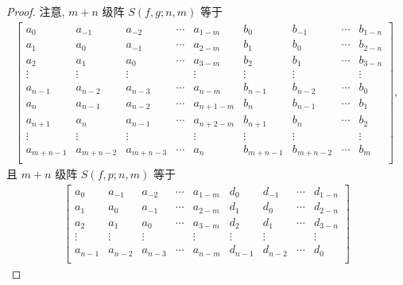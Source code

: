 \documentclass[../libro.tex]{subfiles}
\begin{document}
\begin{proof}
    注意, \(m + n\) 级阵 \(S(f, g; n, m)\) 等于
    \begin{align*}
        \begin{bmatrix}
            a_{0}     & a_{-1}    & a_{-2}    & \cdots & a_{1-m}   & b_{0}     & b_{-1}    & \cdots & b_{1-n} \\
            a_{1}     & a_{0}     & a_{-1}    & \cdots & a_{2-m}   & b_{1}     & b_{0}     & \cdots & b_{2-n} \\
            a_{2}     & a_{1}     & a_{0}     & \cdots & a_{3-m}   & b_{2}     & b_{1}     & \cdots & b_{3-n} \\
            \vdots    & \vdots    & \vdots    & {}     & \vdots    & \vdots    & \vdots    & {}     & \vdots  \\
            a_{n-1}   & a_{n-2}   & a_{n-3}   & \cdots & a_{n-m}   & b_{n-1}   & b_{n-2}   & \cdots & b_{0}   \\
            a_{n}     & a_{n-1}   & a_{n-2}   & \cdots & a_{n+1-m} & b_{n}     & b_{n-1}   & \cdots & b_{1}   \\
            a_{n+1}   & a_{n}     & a_{n-1}   & \cdots & a_{n+2-m} & b_{n+1}   & b_{n}     & \cdots & b_{2}   \\
            \vdots    & \vdots    & \vdots    & {}     & \vdots    & \vdots    & \vdots    & {}     & \vdots  \\
            a_{m+n-1} & a_{m+n-2} & a_{m+n-3} & \cdots & a_{n}     & b_{m+n-1} & b_{m+n-2} & \cdots & b_{m}   \\
        \end{bmatrix},
    \end{align*}
    且 \(m + n\) 级阵 \(S(f, p; n, m)\) 等于
    \begin{align*}
        \begin{bmatrix}
            a_{0}     & a_{-1}    & a_{-2}    & \cdots & a_{1-m}   & d_{0}     & d_{-1}    & \cdots & d_{1-n} \\
            a_{1}     & a_{0}     & a_{-1}    & \cdots & a_{2-m}   & d_{1}     & d_{0}     & \cdots & d_{2-n} \\
            a_{2}     & a_{1}     & a_{0}     & \cdots & a_{3-m}   & d_{2}     & d_{1}     & \cdots & d_{3-n} \\
            \vdots    & \vdots    & \vdots    & {}     & \vdots    & \vdots    & \vdots    & {}     & \vdots  \\
            a_{n-1}   & a_{n-2}   & a_{n-3}   & \cdots & a_{n-m}   & d_{n-1}   & d_{n-2}   & \cdots & d_{0}   \\

\end{bmatrix}
\end{align*}
\end{proof}
\end{document}
